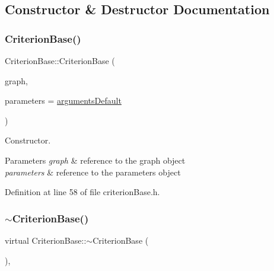 \subsection{Constructor \& Destructor Documentation}
\mbox{\label{classCriterionBase_a23370b412ce1e656415f77126e55f194}} 
\subsubsection{\texorpdfstring{Criterion\+Base()}{CriterionBase()}}
{\footnotesize\ttfamily Criterion\+Base\+::\+Criterion\+Base (\begin{DoxyParamCaption}\item[{const \hyperlink{classGraphUndirectedGroupable}{Graph\+Undirected\+Groupable} \&}]{graph,  }\item[{const \hyperlink{structProgramParameters}{Program\+Parameters} \&}]{parameters = {\ttfamily \hyperlink{program_8h_ae2d819404495f80f31db7676c1329d19}{arguments\+Default}} }\end{DoxyParamCaption})\hspace{0.3cm}{\ttfamily [inline]}}

Constructor.


\begin{DoxyParams}{Parameters}
{\em graph} & reference to the graph object \\
\hline
{\em parameters} & reference to the parameters object \\
\hline
\end{DoxyParams}


Definition at line 58 of file criterion\+Base.\+h.

\mbox{\label{classCriterionBase_a6787dc90e0ac605e3115949cb19f0867}} 
\subsubsection{\texorpdfstring{$\sim$\+Criterion\+Base()}{~CriterionBase()}}
{\footnotesize\ttfamily virtual Criterion\+Base\+::$\sim$\+Criterion\+Base (\begin{DoxyParamCaption}{ }\end{DoxyParamCaption})\hspace{0.3cm}{\ttfamily [inline]}, {\ttfamily [virtual]}}

